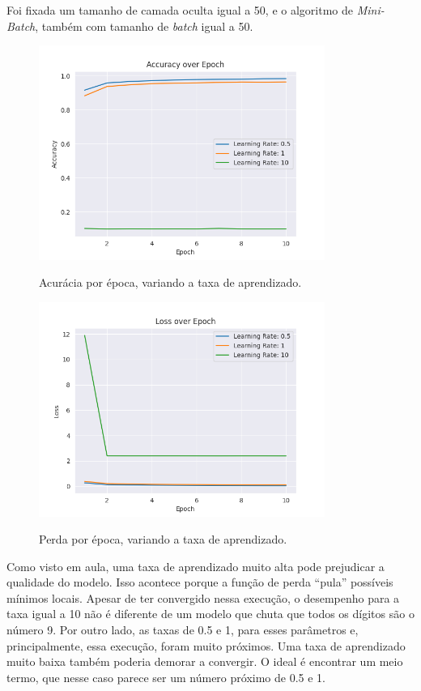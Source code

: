 \documentclass[a4paper]{article}
\begin{document}
Foi fixada um tamanho de camada oculta igual a 50, e o algoritmo de \textit{Mini-Batch}, também com tamanho de \textit{batch} igual a 50.

\begin{figure}[H]
  \begin{center}
  {\includegraphics[height=7cm]{./images/Accuracy_over_Epoch_var_Rate.png}}
  \end{center}
  \caption{Acurácia por época, variando a taxa de aprendizado. \label{fig:aer}}
\end{figure}

\begin{figure}[H]
  \begin{center}
  {\includegraphics[height=7cm]{./images/Loss_over_Epoch_var_Rate.png}}
  \end{center}
  \caption{Perda por época, variando a taxa de aprendizado. \label{fig:ler}}
\end{figure}

Como visto em aula, uma taxa de aprendizado muito alta pode prejudicar a qualidade do modelo. Isso acontece porque a função de perda “pula” possíveis mínimos locais. Apesar de ter convergido nessa execução, o desempenho para a taxa igual a 10 não é diferente de um modelo que chuta que todos os dígitos são o número 9. Por outro lado, as taxas de 0.5 e 1, para esses parâmetros e, principalmente, essa execução, foram muito próximos. Uma taxa de aprendizado muito baixa também poderia demorar a convergir. O ideal é encontrar um meio termo, que nesse caso parece ser um número próximo de 0.5 e 1.
\end{document}
